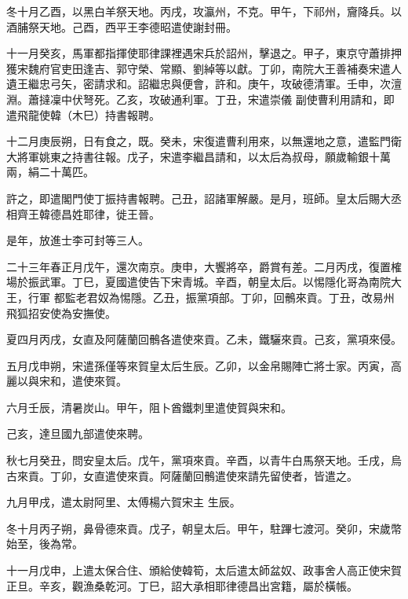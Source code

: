 \begin{pinyinscope}
 冬十月乙酉，以黑白羊祭天地。丙戌，攻瀛州，不克。甲午，下祁州，齎降兵。以酒脯祭天地。己酉，西平王李德昭遣使謝封冊。



 十一月癸亥，馬軍都指揮使耶律課裡遇宋兵於詔州，擊退之。甲子，東京守蕭排押獲宋魏府官吏田逢吉、郭守榮、常顯、劉綽等以獻。丁卯，南院大王善補奏宋遣人遺王繼忠弓矢，密請求和。詔繼忠與便會，許和。庚午，攻破德清軍。壬申，次澶淵。蕭撻凜中伏弩死。乙亥，攻破通利軍。丁丑，宋遣崇儀
 副使曹利用請和，即遣飛龍使韓（木巳）持書報聘。



 十二月庚辰朔，日有食之，既。癸未，宋復遣曹利用來，以無還地之意，遣監門衛大將軍姚東之持書往報。戊子，宋遣李繼昌請和，以太后為叔母，願歲輸銀十萬兩，絹二十萬匹。



 許之，即遣閣門使丁振持書報聘。己丑，詔諸軍解嚴。是月，班師。皇太后賜大丞相齊王韓德昌姓耶律，徙王晉。



 是年，放進士李可封等三人。



 二十三年春正月戊午，還次南京。庚申，大饗將卒，爵賞有差。二月丙戌，復置榷場於振武軍。丁巳，夏國遣使告下宋青城。辛酉，朝皇太后。以惕隱化哥為南院大王，行軍
 都監老君奴為惕隱。乙丑，振黨項部。丁卯，回鶻來貢。丁丑，改易州飛狐招安使為安撫使。



 夏四月丙戌，女直及阿薩蘭回鶻各遣使來貢。乙未，鐵驪來貢。己亥，黨項來侵。



 五月戊申朔，宋遣孫僅等來賀皇太后生辰。乙卯，以金帛賜陣亡將士家。丙寅，高麗以與宋和，遣使來賀。



 六月壬辰，清暑炭山。甲午，阻卜酋鐵刺里遣使賀與宋和。



 己亥，達旦國九部遣使來聘。



 秋七月癸丑，問安皇太后。戊午，黨項來貢。辛酉，以青牛白馬祭天地。壬戌，烏古來貢。丁卯，女直遣使來貢。阿薩蘭回鶻遣使來請先留使者，皆遣之。



 九月甲戌，遣太尉阿里、太傅楊六賀宋主
 生辰。



 冬十月丙子朔，鼻骨德來貢。戊子，朝皇太后。甲午，駐蹕七渡河。癸卯，宋歲幣始至，後為常。



 十一月戊申，上遣太保合住、頒給使韓筍，太后遣太師盆奴、政事舍人高正使宋賀正旦。辛亥，觀漁桑乾河。丁巳，詔大承相耶律德昌出宮籍，屬於橫帳。




\end{pinyinscope}
